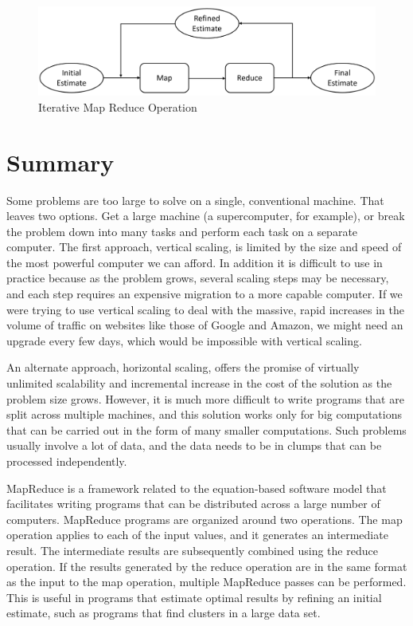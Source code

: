 \begin{figure}
    \begin{center}
        \includegraphics[scale=0.2]{images/iterative-map-reduce-rev}
    \end{center}
    \caption{Iterative Map Reduce Operation}
    \label{iterative-map-reduce}
\end{figure}

\section{Summary}

Some problems are too large to solve on a single, conventional machine.  
That leaves two options.
Get a large machine (a supercomputer, for example),
or break the problem down into many tasks and 
perform each task on a separate computer.
The first approach, 
vertical scaling, 
is limited by the size and speed of the most powerful computer we can afford.  
In addition it is difficult to use in practice because as the problem grows,
several scaling steps may be necessary, 
and each step requires an expensive migration to a more capable computer.
If we were trying to use vertical scaling to deal with the massive, 
rapid increases in the volume of traffic on websites 
like those of Google and Amazon,
we might need an upgrade every few days, 
which would be impossible with vertical scaling.

An alternate approach, 
horizontal scaling,
offers the promise of virtually unlimited
scalability and incremental increase
in the cost of the solution as the problem size grows.
However, it is much more difficult
to write programs that are split across multiple machines,
and this solution works only
for big computations that can be carried out
in the form of many smaller computations.
Such problems usually involve a lot of data,
and the data needs to be in clumps
that can be processed independently.

MapReduce 
is a framework related
to the equation-based software model that facilitates writing
programs that can be distributed across a large number of computers.
MapReduce programs are organized around two operations.
The map operation applies to each of the input values, and
it generates an intermediate result.
The intermediate results are subsequently combined using the reduce operation.
If the results generated by the reduce operation are in the same format
as the input to the map operation, multiple MapReduce passes can be performed.
This is useful in programs that estimate optimal results by refining an initial estimate,
such as programs that find clusters in a large data set.


